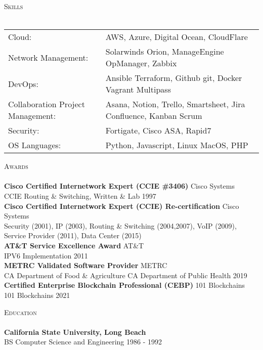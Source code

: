 \documentclass[a4paper]{article}
\newcommand{\lineunder} {
    \vspace*{-8pt} \\
    \hspace*{-18pt} \hrulefill \\
}
\newcommand{\header} [1] {
    {\hspace*{-18pt}\vspace*{6pt} \textsc{#1}}
    \vspace*{-6pt} \lineunder
}
\begin{document}
\header{Skills}
\begin{tabular}{ l l }
	Cloud:                                       & AWS, Azure, Digital Ocean, CloudFlare                                                               \\
	Network Management:                          & Solarwinds Orion, ManageEngine OpManager, Zabbix                                                    \\
	DevOps:                                      & Ansible \textbar{} Terraform, Github \textbar{} git, Docker \textbar{} Vagrant \textbar{} Multipass \\
	Collaboration \textbar{} Project Management: & Asana, Notion, Trello, Smartsheet, Jira \textbar{} Confluence, Kanban \textbar{} Scrum              \\
	Security:                                    & Fortigate, Cisco ASA, Rapid7                                                                        \\
	OS \textbar{} Languages:                                   & Python, Javascript, Linux \textbar{} MacOS, PHP                                                                             \\
\end{tabular}
\vspace{2mm}



\header{Awards}
\textbf{Cisco Certified Internetwork Expert (CCIE \#3406)} \hfill Cisco Systems\\
CCIE Routing \& Switching, Written \& Lab \hfill 1997\\
\vspace*{2mm}
\textbf{Cisco Certified Internetwork Expert (CCIE) Re-certification} \hfill Cisco Systems\\
Security (2001), IP (2003), Routing \& Switching (2004,2007), VoIP (2009), Service Provider (2011), Data Center (2015)\\
\vspace*{2mm}
\textbf{AT\&T Service Excellence Award} \hfill AT\&T\\
IPV6 Implementation \hfill 2011\\
\vspace*{2mm}
\textbf{METRC Validated Software Provider} \hfill METRC\\
CA Department of Food \& Agriculture \textbar{} CA Department of Public Health \hfill 2019\\
\vspace*{2mm}
\textbf{Certified Enterprise Blockchain Professional (CEBP)} \hfill 101 Blockchains\\
101 Blockchains \hfill 2021\\
\vspace*{2mm}

\header{Education}
\textbf{California State University, Long Beach}\\
BS Computer Science and Engineering \hfill 1986 - 1992\\
\vspace{2mm}

\ 
\end{document}
